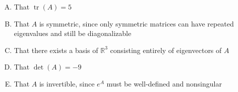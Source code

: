 \documentclass[12pt]{amsart}
\begin{document}
\vspace{-0.1in}
\begin{enumerate}[(A)]
\item That $\operatorname{tr}(A) = 5$
\item That $A$ is symmetric, since only symmetric matrices can have repeated eigenvalues and still be diagonalizable
\item That there exists a basis of $\mathbb{R}^3$ consisting entirely of eigenvectors of $A$
\item That $\det(A) = -9$
\item That $A$ is invertible, since $e^A$ must be well-defined and nonsingular
\end{enumerate}

%
%
%
%
%
%
%
%
\end{document}
